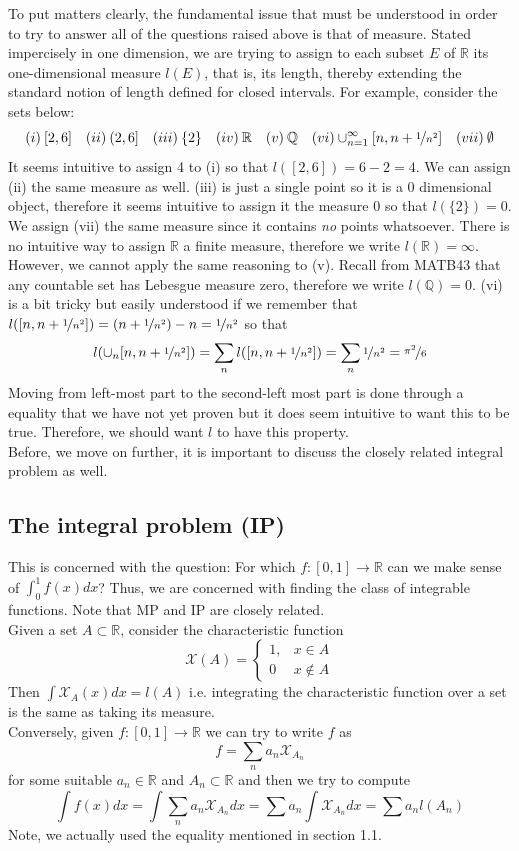 \documentclass[a4paper, 11pt]{book}
\theoremstyle{definition}
\theoremstyle{remark}
\begin{document}
    To put matters clearly, the fundamental issue that must be understood in order to try to answer all of the questions raised above
    is that of measure. Stated impercisely in one dimension, we are trying to assign to each subset $E$ of $\mathbb{R}$ its 
    one-dimensional measure $l(E)$, that is, its length, thereby extending the standard notion of length defined for closed intervals.
    For example, consider the sets below:
    \[ (i)\: [2,6] \quad (ii)\: (2,6] \quad (iii)\: \{2\} \quad (iv)\: \mathbb{R} \quad (v)\: \mathbb{Q} \quad (vi) 
        \cup_{n=1}^{\infty} [n,n+\nicefrac{1}{n^2}] \quad (vii)\: \emptyset\]
    It seems intuitive to assign 4 to (i) so that $l([2,6]) = 6 - 2 = 4$. We can assign (ii) the same measure as well. (iii) is just
    a single point so it is a 0 dimensional object, therefore it seems intuitive to assign it the measure 0 so that $l(\{2\}) = 0$.
    We assign (vii) the same measure since it contains \textit{no} points whatsoever. There is no intuitive way to assign
    $\mathbb{R}$ a finite measure, therefore we write $l(\mathbb{R}) = \infty$. However, we cannot apply the same reasoning to (v).
    Recall from MATB43 that any countable set has Lebesgue measure zero, therefore we write $l(\mathbb{Q}) = 0$. (vi) is a bit tricky
    but easily understood if we remember that $l([n,n+\nicefrac{1}{n^2}]) = (n+\nicefrac{1}{n^2}) - n = \nicefrac{1}{n^2}$ so that
    \[ l(\cup_{n} [n,n+\nicefrac{1}{n^2}]) = \sum_n l([n,n+\nicefrac{1}{n^2}]) = \sum_n \nicefrac{1}{n^2} = \nicefrac{\pi^2}{6} \]
    Moving from left-most part to the second-left most part is done through a equality that we have not yet proven but it does
    seem intuitive to want this to be true. Therefore, we should want $l$ to have this property.\\
    Before, we move on further, it is important to discuss the closely related integral problem as well.

    \subsection{The integral problem (IP)}
    This is concerned with the question: For which $f: [0,1]\to\mathbb{R}$ can we make sense of $\int_0^1 f(x)dx$? Thus, we are
    concerned with finding the class of integrable functions. Note that MP and IP are closely related.\\
    Given a set $A\subset\mathbb{R}$, consider the characteristic function
    \[ \mathcal{X}(A) = \begin{cases} 
            1, & x\in A \\
            0  & x\not\in A
       \end{cases} \]
   Then $\int \mathcal{X}_A(x)dx = l(A)$ i.e. integrating the characteristic function over a set is the same as taking its measure.\\
   Conversely, given $f:[0,1]\to\mathbb{R}$ we can try to write $f$ as 
   \[ f = \sum_n a_n\mathcal{X}_{A_n} \]
   for some suitable $a_n\in\mathbb{R}$ and $A_n\subset\mathbb{R}$ and then we try to compute
   \[ \int f(x)dx = \int \sum_n a_n\mathcal{X}_{A_n}dx = \sum a_n\int \mathcal{X}_{A_n}dx = \sum a_nl(A_n) \]
   Note, we actually used the equality mentioned in section 1.1.
\end{document}
